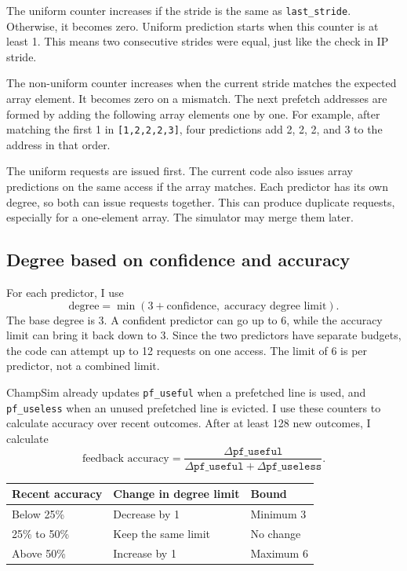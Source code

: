 \documentclass[11pt,a4paper]{article}
\begin{document}
The uniform counter increases if the stride is the same as
\texttt{last\_stride}. Otherwise, it becomes zero. Uniform prediction
starts when this counter is at least 1. This means two consecutive
strides were equal, just like the check in IP stride.

The non-uniform counter increases when the current stride matches the
expected array element. It becomes zero on a mismatch. The next
prefetch addresses are formed by adding the following array elements
one by one. For example, after matching the first 1 in
\texttt{[1,2,2,2,3]}, four predictions add 2, 2, 2, and 3 to the address
in that order.

The uniform requests are issued first. The current code also issues
array predictions on the same access if the array matches. Each
predictor has its own degree, so both can issue requests together.
This can produce duplicate requests, especially for a one-element
array. The simulator may merge them later.

\subsection{Degree based on confidence and accuracy}

For each predictor, I use
\[
\text{degree} = \min(3 + \text{confidence},\;\text{accuracy degree limit}).
\]
The base degree is 3. A confident predictor can go up to 6, while the
accuracy limit can bring it back down to 3. Since the two predictors
have separate budgets, the code can attempt up to 12 requests on one
access. The limit of 6 is per predictor, not a combined limit.

ChampSim already updates \texttt{pf\_useful} when a prefetched line is
used, and \texttt{pf\_useless} when an unused prefetched line is evicted.
I use these counters to calculate accuracy over recent outcomes. After
at least 128 new outcomes, I calculate
\[
\text{feedback accuracy} =
\frac{\Delta\texttt{pf\_useful}}
{\Delta\texttt{pf\_useful} + \Delta\texttt{pf\_useless}}.
\]

\begin{center}
\begin{tabular}{lll}
\toprule
Recent accuracy & Change in degree limit & Bound \\
\midrule
Below 25\% & Decrease by 1 & Minimum 3 \\
25\% to 50\% & Keep the same limit & No change \\
Above 50\% & Increase by 1 & Maximum 6 \\
\bottomrule
\end{tabular}
\end{center}
\end{document}
